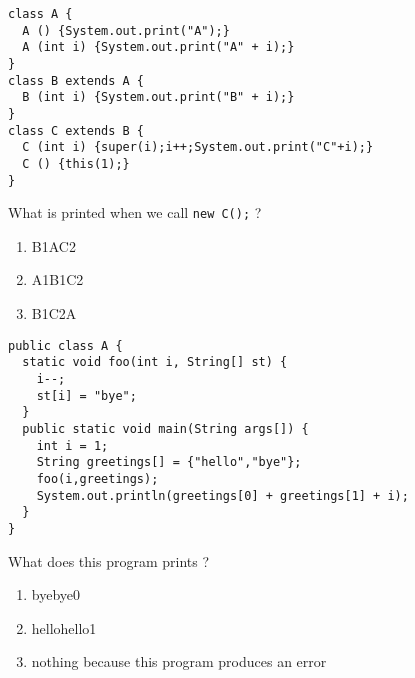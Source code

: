 \documentclass[correction]{exercices}
\begin{document}
\begin{question}
\hfill

\begin{lstlisting}
class A {
  A () {System.out.print("A");}
  A (int i) {System.out.print("A" + i);}
}
class B extends A {
  B (int i) {System.out.print("B" + i);}
}
class C extends B {
  C (int i) {super(i);i++;System.out.print("C"+i);}
  C () {this(1);}
}
\end{lstlisting}

What is printed when we call \lstinline!new C();! ?
\begin{enumerate}
\item B1AC2
\item A1B1C2
\item B1C2A
\end{enumerate}
\end{question}

\begin{question} \hfill
\begin{lstlisting}
public class A {
  static void foo(int i, String[] st) {
    i--;
    st[i] = "bye";
  }
  public static void main(String args[]) {
    int i = 1;
    String greetings[] = {"hello","bye"}; 
    foo(i,greetings);
    System.out.println(greetings[0] + greetings[1] + i);
  }
}
\end{lstlisting}

What does this program prints ?
\begin{enumerate}
\item byebye0
\item hellohello1
\item nothing because this program produces an error
\end{enumerate}
\end{question}
\end{document}
